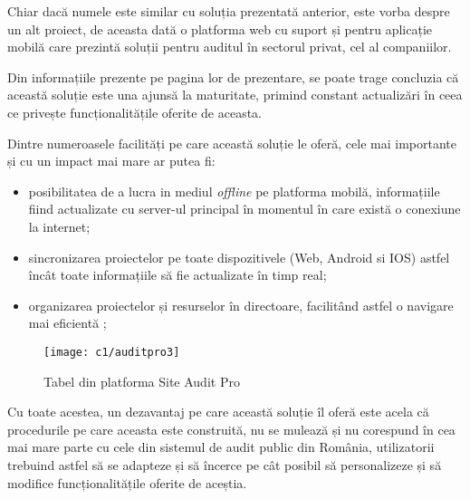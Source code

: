 	Chiar dacă numele este similar cu soluția prezentată anterior, este vorba despre un alt proiect, de aceasta dată o platforma web cu suport și pentru aplicație mobilă care prezintă soluții pentru auditul în sectorul privat, cel al companiilor.
	
	Din informațiile prezente pe pagina  lor de prezentare, se poate trage concluzia că această soluție este una ajunsă la maturitate, primind constant actualizări în ceea ce privește funcționalitățile oferite de aceasta.
	 
	Dintre numeroasele facilități pe care această soluție le oferă, cele mai importante și cu un impact mai mare ar putea fi:
	\begin{itemize}
		\item posibilitatea de a lucra in mediul \textit{offline} pe platforma mobilă, informațiile fiind actualizate cu server-ul principal în momentul în care există o conexiune la internet;
		
		\item sincronizarea proiectelor pe toate dispozitivele (Web, Android si IOS) astfel încât toate informațiile să fie actualizate în timp real;
		
		\item organizarea proiectelor și resurselor în directoare, facilitând astfel o navigare mai eficientă ;
	\end{itemize}
	\begin{figure}[h]
		\centering
		
		\texttt{[image: c1/auditpro3]}
		\caption{Tabel din platforma Site Audit Pro}
	\end{figure}
	
	Cu toate acestea, un dezavantaj pe care această soluție îl oferă este acela că procedurile pe care aceasta este construită, nu se mulează și nu corespund în cea mai mare parte cu cele din sistemul de audit public din România, utilizatorii trebuind astfel să se adapteze și să încerce pe cât posibil să personalizeze și să modifice funcționalitățile oferite de aceștia.
	
	
	
	
